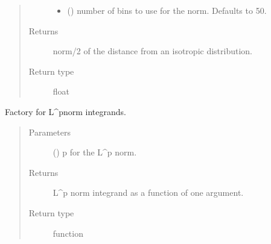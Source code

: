 \documentclass[letterpaper,10pt,english]{sphinxmanual}
\begin{document}
\begin{fulllineitems}
\begin{quote}
\begin{description}
\begin{itemize}
\item {} 
 (\sphinxstyleliteralemphasis{\sphinxupquote{, }}) \textendash{} number of bins to use for the norm. Defaults
to 50.

\end{itemize}

\item[{Returns}] \leavevmode
norm/2 of the distance from an isotropic distribution.

\item[{Return type}] \leavevmode
float

\end{description}\end{quote}

\end{fulllineitems}


\begin{fulllineitems}
\label{\detokenize{analysis:scdc.analyze.p_dist}}
Factory for L\textasciicircum{}p\sphinxhyphen{}norm integrands.
\begin{quote}\begin{description}
\item[{Parameters}] \leavevmode
{} () \textendash{} p for the L\textasciicircum{}p norm.

\item[{Returns}] \leavevmode
L\textasciicircum{}p norm integrand as a function of one argument.

\item[{Return type}] \leavevmode
function

\end{description}\end{quote}

\end{fulllineitems}

\end{document}
